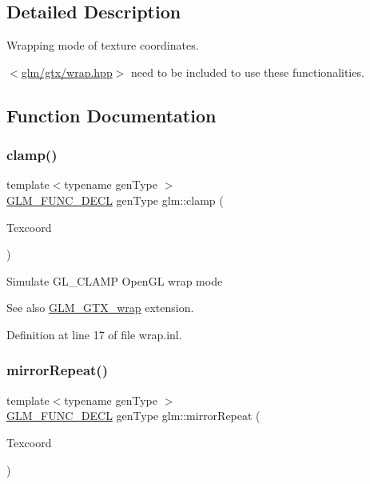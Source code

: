 \subsection{Detailed Description}
Wrapping mode of texture coordinates. 

$<$\hyperlink{wrap_8hpp}{glm/gtx/wrap.\+hpp}$>$ need to be included to use these functionalities. 

\subsection{Function Documentation}
\mbox{\label{group__gtx__wrap_ga6c0cc6bd1d67ea1008d2592e998bad33}} 
\subsubsection{\texorpdfstring{clamp()}{clamp()}}
{\footnotesize\ttfamily template$<$typename gen\+Type $>$ \\
\hyperlink{setup_8hpp_ab2d052de21a70539923e9bcbf6e83a51}{G\+L\+M\+\_\+\+F\+U\+N\+C\+\_\+\+D\+E\+CL} gen\+Type glm\+::clamp (\begin{DoxyParamCaption}\item[{gen\+Type const \&}]{Texcoord }\end{DoxyParamCaption})}

Simulate G\+L\+\_\+\+C\+L\+A\+MP Open\+GL wrap mode \begin{DoxySeeAlso}{See also}
\hyperlink{group__gtx__wrap}{G\+L\+M\+\_\+\+G\+T\+X\+\_\+wrap} extension. 
\end{DoxySeeAlso}


Definition at line 17 of file wrap.\+inl.

\mbox{\label{group__gtx__wrap_ga16a89b0661b60d5bea85137bbae74d73}} 
\subsubsection{\texorpdfstring{mirror\+Repeat()}{mirrorRepeat()}}
{\footnotesize\ttfamily template$<$typename gen\+Type $>$ \\
\hyperlink{setup_8hpp_ab2d052de21a70539923e9bcbf6e83a51}{G\+L\+M\+\_\+\+F\+U\+N\+C\+\_\+\+D\+E\+CL} gen\+Type glm\+::mirror\+Repeat (\begin{DoxyParamCaption}\item[{gen\+Type const \&}]{Texcoord }\end{DoxyParamCaption})}

